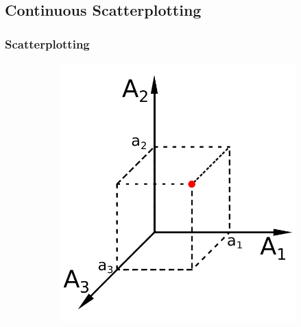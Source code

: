 \documentclass[a4paper,fontsize=12pt,toc=bib,halfparskip]{scrartcl}
\begin{document}
\subsection{Continuous Scatterplotting}
\subsubsection{Scatterplotting}
\begin{figure}
	\hspace{2cm}
	\begin{subfigure}{0.30\textwidth}
		\includegraphics[width=\textwidth]{pictures/Scatterplot3D}
		\caption{}
	\end{subfigure}
	\hfill
	\begin{subfigure}{0.30\textwidth}

\end{subfigure}
\end{figure}
\end{document}

